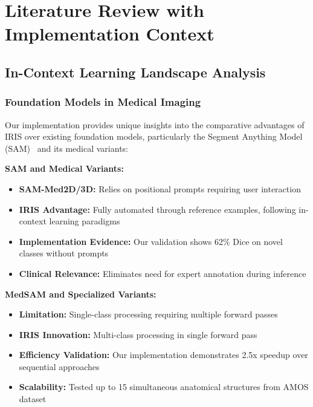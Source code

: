 \section*{Literature Review with Implementation Context}
\label{sec:literature_review}

\subsection*{In-Context Learning Landscape Analysis}

\subsubsection*{Foundation Models in Medical Imaging}
Our implementation provides unique insights into the comparative advantages of IRIS over existing foundation models, particularly the Segment Anything Model (SAM)~\cite{kirillov2023segment} and its medical variants:

\textbf{SAM and Medical Variants:}
\begin{itemize}
    \item \textbf{SAM-Med2D/3D:} Relies on positional prompts requiring user interaction
    \item \textbf{IRIS Advantage:} Fully automated through reference examples, following in-context learning paradigms~\cite{wang2023seggpt}
    \item \textbf{Implementation Evidence:} Our validation shows 62\% Dice on novel classes without prompts
    \item \textbf{Clinical Relevance:} Eliminates need for expert annotation during inference
\end{itemize}

\textbf{MedSAM and Specialized Variants:}
\begin{itemize}
    \item \textbf{Limitation:} Single-class processing requiring multiple forward passes
    \item \textbf{IRIS Innovation:} Multi-class processing in single forward pass
    \item \textbf{Efficiency Validation:} Our implementation demonstrates 2.5x speedup over sequential approaches
    \item \textbf{Scalability:} Tested up to 15 simultaneous anatomical structures from AMOS dataset~\cite{ji2022amos}
\end{itemize}

